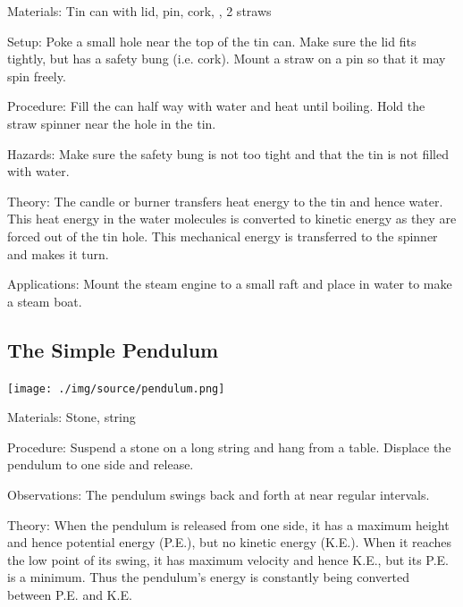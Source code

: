 \begin{multicols}{2}
\begin{description*}
\item[Materials:]{Tin can with lid, pin, cork, , 2 straws}
\item[Setup:]{Poke a small hole near the top of the tin can. Make sure the lid fits tightly, but has a safety bung (i.e. cork). Mount a straw on a pin so that it may spin freely.}
\item[Procedure:]{Fill the can half way with water and heat until boiling. Hold the straw spinner near the hole in the tin.}
\item[Hazards:]{Make sure the safety bung is not too tight and that the tin is not filled with water.}
\item[Theory:]{The candle or burner transfers heat energy to the tin and hence water. This heat energy in the water molecules is converted to kinetic energy as they are forced out of the tin hole. This mechanical energy is transferred to the spinner and makes it turn.}
\item[Applications:]{Mount the steam engine to a small raft and place in water to make a steam boat.}
\end{description*}

\columnbreak

\subsection{The Simple Pendulum}

\begin{center}
\texttt{[image: ./img/source/pendulum.png]}
\end{center}

\begin{description*}
\item[Materials:]{Stone, string}
\item[Procedure:]{Suspend a stone on a long string and hang from a table. Displace the pendulum to one side and release.}
\item[Observations:]{The pendulum swings back and forth at near regular intervals.}
\item[Theory:]{When the pendulum is released from one side, it has a maximum height and hence potential energy (P.E.), but no kinetic energy (K.E.). When it reaches the low point of its swing, it has maximum velocity and hence K.E., but its P.E. is a minimum. Thus the pendulum's energy is constantly being converted between P.E. and K.E.}
\end{description*}


\end{multicols}
